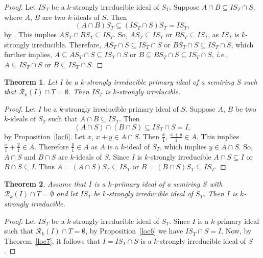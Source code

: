 \documentclass[11pt,english]{amsart}
\newtheorem{theorem}{Theorem}[section]
\theoremstyle{definition}
\numberwithin{equation}{section}
\begin{document}
\begin{proof}
Let $IS_T$ be a $k$-strongly irreducible ideal of $S_T$. Suppose $A\cap B\subseteq IS_T\cap S$, where $A$, $B$ are two $k$-ideals of $S$. Then \[(A\cap B)S_T\subseteq (IS_T\cap S)S_T=IS_T,\] by \cite[Lemma 4]{Atani08}. This implies $AS_T\cap BS_T\subseteq IS_T$. So, $AS_T\subseteq IS_T$ or $BS_T\subseteq IS_T$, as $IS_T$ is $k$-strongly irreducible. Therefore, $AS_T\cap S\subseteq IS_T\cap S$ or $BS_T\cap S\subseteq IS_T\cap S$, which further implies, $A\subseteq AS_T\cap S\subseteq IS_T\cap S$ or $B\subseteq BS_T\cap S\subseteq IS_T\cap S$,  \textit{i.e.}, $A\subseteq IS_T\cap S$ or $B\subseteq IS_T\cap S$. 	
\end{proof}

\begin{theorem}
Let $I$ be a $k$-strongly irreducible primary ideal of a semiring $S$ such that
$\mathcal{R}_k(I) \cap T = \emptyset$. Then $IS_T$ is $k$-strongly irreducible.
\end{theorem}

\begin{proof}
Let $I$ be a $k$-strongly irreducible primary ideal of $S$. Suppose $A$, $B$ be two $k$-ideals of $S_T$ such that $A\cap B \subseteq IS_T$. Then \[(A\cap S)\cap (B\cap S)\subseteq IS_T\cap S=I,\] by Proposition~\ref{loc6}. Let $x$, $x+y\in A\cap S$. Then $\frac{x}{1}$, $\frac{x+y}{1}\in A$. This implies $\frac{x}{1}+\frac{y}{1} \in A$. Therefore $\frac{y}{1}\in A$ as $A$ is a $k$-ideal of $S_T$, which implies $y\in A\cap S$. So, $A\cap S$ and $B\cap S$ are $k$-ideals of $S$. Since $I$ is $k$-strongly irreducible $A\cap S\subseteq I$ or $B\cap S\subseteq I$. Thus $A=(A\cap S)S_T\subseteq IS_T$ or $B=(B\cap S)S_T\subseteq IS_T$.		
\end{proof}

\begin{theorem}
Assume that $I$ is a $k$-primary ideal of a semiring $S$ with $\mathcal{R}_k(I) \cap T = \emptyset$
and let $IS_T$ be $k$-strongly irreducible ideal of $S_T$. Then $I$ is $k$-strongly irreducible.
\end{theorem}

\begin{proof}
Let $IS_T$ be a $k$-strongly irreducible ideal of $S_T$. Since $I$ is a $k$-primary ideal such that $\mathcal{R}_k(I)\cap T=\emptyset$, by Proposition~\ref{loc6} we have $IS_T\cap S=I$. Now, by Theorem~\ref{loc7}, it follows that $I=IS_T\cap S$ is a $k$-strongly irreducible ideal of $S$.		
\end{proof}
\end{document}
